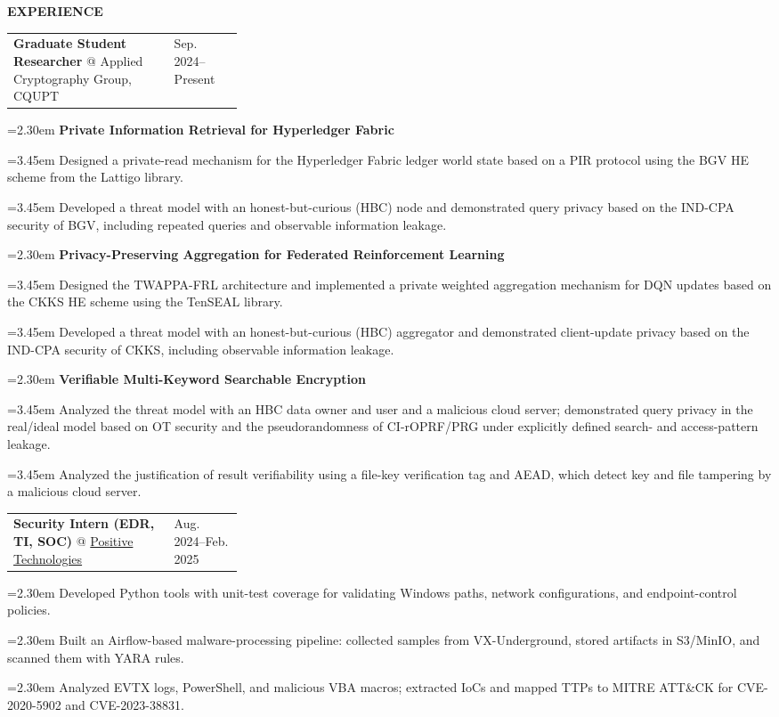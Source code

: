 \documentclass[11pt,a4paper]{article}
\makeatletter
\newcommand{\cvrow}[2]{%
  \noindent
  \begin{minipage}[t]{0.145\textwidth}
    \vspace{0pt}%
    \raggedright
    \fontsize{8.5}{10}\selectfont
    \bfseries\MakeUppercase{#1}
  \end{minipage}%
  \hfill
  \begin{minipage}[t]{0.835\textwidth}
    \vspace{0pt}%
    #2
  \end{minipage}\par
}
\newcommand{\workentry}[2]{%
  \noindent
  \begin{tabularx}{\linewidth}
    {@{}X@{\hspace{0.8em}}
    >{\raggedleft\arraybackslash}p{0.30\linewidth}@{}}
    #1 & \small #2
  \end{tabularx}\par
  \vspace{0.15em}
}
\newcommand{\workproject}[1]{%
  \noindent
  \hangindent=2.30em
  \hangafter=1
  \hspace*{1.15em}\makebox[1.15em][l]{$\diamond$}#1\par
  \vspace{0.12em}
}
\newcommand{\workprojectdetail}[1]{%
  \noindent
  \hangindent=3.45em
  \hangafter=1
  \hspace*{2.30em}\makebox[1.15em][l]{--}#1\par
  \vspace{0.08em}
}
\makeatother
\begin{document}
\cvrow{Experience}{%
  \workentry
    {\textbf{Graduate Student Researcher} @ Applied Cryptography Group, CQUPT}
    {Sep. 2024--Present}

  \workproject{\textbf{Private Information Retrieval for Hyperledger Fabric}}
  \workprojectdetail{Designed a private-read mechanism for the Hyperledger Fabric
  ledger world state based on a PIR protocol using the BGV HE scheme from the
  Lattigo library.}
  \workprojectdetail{Developed a threat model with an honest-but-curious (HBC) node
  and demonstrated query privacy based on the IND-CPA security of BGV, including
  repeated queries and observable information leakage.}

  \workproject{\textbf{Privacy-Preserving Aggregation for Federated Reinforcement Learning}}
  \workprojectdetail{Designed the TWAPPA-FRL architecture and implemented a private
  weighted aggregation mechanism for DQN updates based on the CKKS HE scheme using
  the TenSEAL library.}
  \workprojectdetail{Developed a threat model with an honest-but-curious (HBC)
  aggregator and demonstrated client-update privacy based on the IND-CPA security
  of CKKS, including observable information leakage.}

  \workproject{\textbf{Verifiable Multi-Keyword Searchable Encryption}}
  \workprojectdetail{Analyzed the threat model with an HBC data owner and user and
  a malicious cloud server; demonstrated query privacy in the real/ideal model
  based on OT security and the pseudorandomness of CI-rOPRF/PRG under explicitly
  defined search- and access-pattern leakage.}
  \workprojectdetail{Analyzed the justification of result verifiability using a
  file-key verification tag and AEAD, which detect key and file tampering by a
  malicious cloud server.}
}

\vspace{0.50em}

\cvrow{}{%
  \workentry
    {\textbf{Security Intern (EDR, TI, SOC)} @
    \href{https://global.ptsecurity.com/en/}{Positive Technologies}}
    {Aug. 2024--Feb. 2025}

  \workproject{Developed Python tools with unit-test coverage for validating
  Windows paths, network configurations, and endpoint-control policies.}
  \workproject{Built an Airflow-based malware-processing pipeline: collected
  samples from VX-Underground, stored artifacts in S3/MinIO, and scanned them
  with YARA rules.}
  \workproject{Analyzed EVTX logs, PowerShell, and malicious VBA macros; extracted
  IoCs and mapped TTPs to MITRE ATT\&CK for CVE-2020-5902 and CVE-2023-38831.}
}
\end{document}
